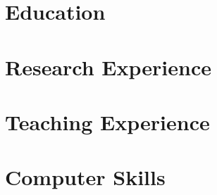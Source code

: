 \documentclass[11pt,letterpaper,sans]{moderncv}
\begin{document}
    \makecvtitle

\section{Education}
    
    

\section{Research Experience}
	
	
	

\section{Teaching Experience}
    
    

%     
%     
%     

%     

%     

\section{Computer Skills}
    
\end{document}

